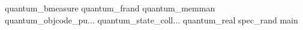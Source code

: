 quantum_bmeasure
quantum_frand
quantum_memman
quantum_objcode_pu...
quantum_state_coll...
quantum_real
spec_rand
main
